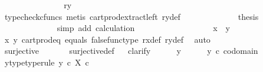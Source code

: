 \begin{isabellebody}
\ \ \ \ \ \ \ \ \ \ \isamarkupfalse%
\ \isamarkupfalse%
\ {\isachardoublequoteopen}{\isachardot}{\kern0pt}{\isachardot}{\kern0pt}{\isachardot}{\kern0pt}\ {\isacharequal}{\kern0pt}\ {\isasymlangle}ry{\isacharcomma}{\kern0pt}\ {\isasymf}{\isasymrangle}{\isachardoublequoteclose}\isanewline
\ \ \ \ \ \ \ \ \ \ \ \ \isamarkupfalse%
\ {\isacharparenleft}{\kern0pt}typecheck{\isacharunderscore}{\kern0pt}cfuncs{\isacharcomma}{\kern0pt}\ metis\ cart{\isacharunderscore}{\kern0pt}prod{\isacharunderscore}{\kern0pt}extract{\isacharunderscore}{\kern0pt}left\ ry{\isacharunderscore}{\kern0pt}def{\isacharparenright}{\kern0pt}\isanewline
\ \ \ \ \ \ \ \ \ \ \isamarkupfalse%
\ \isamarkupfalse%
\ {\isacharquery}{\kern0pt}thesis\isanewline
\ \ \ \ \ \ \ \ \ \ \ \ \isamarkupfalse%
\ {\isacharparenleft}{\kern0pt}simp\ add{\isacharcolon}{\kern0pt}\ calculation{\isacharparenright}{\kern0pt}\isanewline
\ \ \ \ \ \ \ \ \isamarkupfalse%
\isanewline
\ \ \ \ \ \ \ \ \isamarkupfalse%
\ {\isachardoublequoteopen}x\ {\isacharequal}{\kern0pt}\ y{\isachardoublequoteclose}\isanewline
\ \ \ \ \ \ \ \ \ \ \isamarkupfalse%
\ {\isasymrho}x\ {\isasymrho}y\ cart{\isacharunderscore}{\kern0pt}prod{\isacharunderscore}{\kern0pt}eq{}\ equals\ false{\isacharunderscore}{\kern0pt}func{\isacharunderscore}{\kern0pt}type\ rx{\isacharunderscore}{\kern0pt}def\ ry{\isacharunderscore}{\kern0pt}def\ \isamarkupfalse%
\ auto\isanewline
\ \ \ \ \ \ \isamarkupfalse%
\isanewline
\ \ \ \ \isamarkupfalse%
\isanewline
\ \ \isamarkupfalse%
\isanewline
\ \ \isamarkupfalse%
\ {\isachardoublequoteopen}surjective\ {\isasymrho}{\isachardoublequoteclose}\isanewline
\ \ \ \ \isamarkupfalse%
\ surjective{\isacharunderscore}{\kern0pt}def\isanewline
\ \ \isamarkupfalse%
{\isacharparenleft}{\kern0pt}clarify{\isacharparenright}{\kern0pt}\isanewline
\ \ \ \ \isamarkupfalse%
\ y\isanewline
\ \ \ \ \isamarkupfalse%
\ {\isachardoublequoteopen}y\ {\isasymin}\isactrlsub c\ codomain\ {\isasymrho}{\isachardoublequoteclose}\ \isamarkupfalse%
\ \isamarkupfalse%
\ y{\isacharunderscore}{\kern0pt}type{\isacharbrackleft}{\kern0pt}type{\isacharunderscore}{\kern0pt}rule{\isacharbrackright}{\kern0pt}{\isacharcolon}{\kern0pt}\ {\isachardoublequoteopen}y\ {\isasymin}\isactrlsub c\ X\ {\isasymtimes}\isactrlsub c\ {\isasymOmega}{\isachardoublequoteclose}\isanewline

\end{isabellebody}
